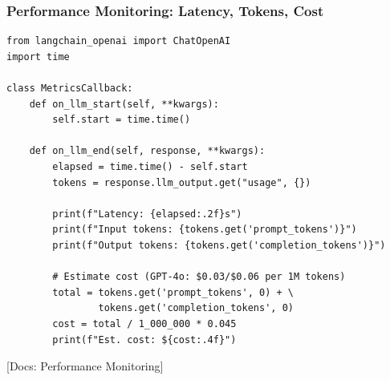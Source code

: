 \documentclass[aspectratio=169,11pt]{beamer}
\newcommand{\docref}[1]{{\scriptsize\color{docgray}[Docs: #1]}}
\begin{document}

\begin{frame}[fragile]
  \frametitle{Performance Monitoring: Latency, Tokens, Cost}

  \begin{lstlisting}
from langchain_openai import ChatOpenAI
import time

class MetricsCallback:
    def on_llm_start(self, **kwargs):
        self.start = time.time()

    def on_llm_end(self, response, **kwargs):
        elapsed = time.time() - self.start
        tokens = response.llm_output.get("usage", {})

        print(f"Latency: {elapsed:.2f}s")
        print(f"Input tokens: {tokens.get('prompt_tokens')}")
        print(f"Output tokens: {tokens.get('completion_tokens')}")

        # Estimate cost (GPT-4o: $0.03/$0.06 per 1M tokens)
        total = tokens.get('prompt_tokens', 0) + \
                tokens.get('completion_tokens', 0)
        cost = total / 1_000_000 * 0.045
        print(f"Est. cost: ${cost:.4f}")
  \end{lstlisting}

  \docref{Performance Monitoring}
\end{frame}

\end{document}
